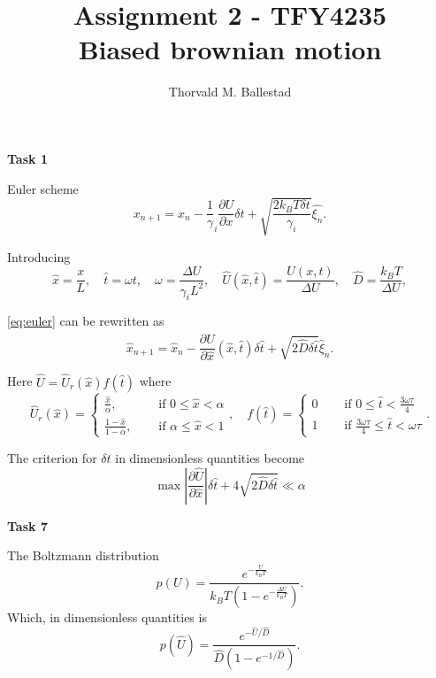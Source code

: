 \documentclass[a4paper, 12pt]{article}
\author{Thorvald M. Ballestad}
\title{Assignment 2 - TFY4235\\
  Biased brownian motion}
\newcommand\beq{\begin{equation}}
\newcommand\eeq{\end{equation}}
\newcommand{\del}[2]{\frac{\partial #1}{\partial #2}}
\begin{document}
\maketitle

\textbf{Task 1}

Euler scheme
\beq\label{eq:euler}
x_{n+1} = x_n - \frac1\gamma_i \del{U}{x} \delta t + \sqrt{\frac{2k_B T\delta t}{\gamma_i}} \hat{\xi_n}.
\eeq

Introducing
\beq
\hat{x} = \frac{x}{L},\quad
\hat{t} = \omega t,\quad
\omega = \frac{\Delta U}{\gamma_i L^2},\quad
\hat{U}(\hat{x}, \hat{t}) = \frac{U(x, t)}{\Delta U},\quad
\hat{D} = \frac{k_BT}{\Delta U},
\eeq

\eqref{eq:euler} can be rewritten as
\beq
\hat{x}_{n+1} = \hat{x}_n - \del{\hat{U}}{\hat{x}}(\hat{x}, \hat{t})\delta \hat{t} + \sqrt{2\hat{D}\delta\hat{t}} \hat{\xi}_n.
\eeq

Here $\hat{U} = \hat{U}_r(\hat{x}) f(\hat{t})$ where
\begin{equation}
  \hat{U}_r(\hat{x}) =
  \begin{cases}
    \frac{\hat{x}}{\alpha}, &\quad \text{ if } 0 \leq \hat{x} < \alpha\\
    \frac{1-\hat{x}}{1-\alpha}, &\quad \text{ if } \alpha \leq \hat{x} < 1
  \end{cases},
  \quad
  f(\hat{t}) =
  \begin{cases}
    0 &\quad \text{ if } 0\leq \hat{t} < \frac{3\omega\tau}{4}\\
    1 &\quad \text{ if } \frac{3\omega\tau}{4} \leq \hat{t} < \omega\tau
  \end{cases}.
\end{equation}

The criterion for $\delta t$ in dimensionless quantities become
\beq
\operatorname{max} \left| \del{\hat{U}}{\hat{x}}\right| \delta \hat{t}
+ 4\sqrt{2\hat{D} \delta\hat{t}} \ll \alpha
\eeq

\textbf{Task 7}

The Boltzmann distribution
\beq
p(U) =
\frac{
  e^{-\frac{U}{k_BT}}
}{
  k_BT \left(
  1 - e^{-\frac{\Delta U}{k_BT}}
  \right)
}.
\eeq
Which, in dimensionless quantities is
\beq
p(\hat{U}) =
\frac{
  e^{-\hat{U}/\hat{D}}
}{
  \hat{D} \left(
  1 - e^{-1/\hat{D}}
  \right)
}.
\eeq
\end{document}
